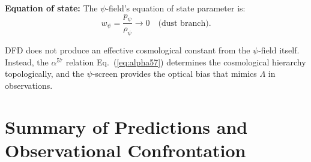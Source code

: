 \documentclass[aps,prd,twocolumn,superscriptaddress,nofootinbib]{revtex4-2}
\begin{document}
\textbf{Equation of state:} The $\psi$-field's equation of
state parameter is:
\begin{equation}\label{eq:w-psi}
w_\psi = \frac{p_\psi}{\rho_\psi} \to 0
\quad\text{(dust branch)}.
\end{equation}

DFD does not produce an effective cosmological constant from the
$\psi$-field itself. Instead, the $\alpha^{57}$ relation
Eq.~(\ref{eq:alpha57}) determines the cosmological hierarchy
topologically, and the $\psi$-screen provides the optical bias
that mimics $\Lambda$ in observations.

\section{Summary of Predictions and Observational Confrontation}
\label{sec:summary-table}
\end{document}
